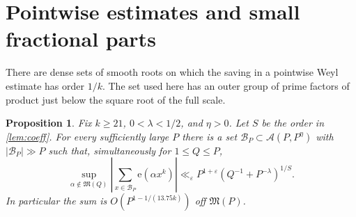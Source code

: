 \documentclass[11pt,letterpaper]{article}
\newtheorem{proposition}[proposition]{Proposition}
\theoremstyle{definition}
\newcommand{\A}{\mathcal A}
\newcommand{\M}{\mathfrak M}
\newcommand{\e}{\mathrm e}
\newcommand{\eps}{\varepsilon}
\begin{document}
\section{Pointwise estimates and small fractional parts}\label{sec:fractional}
There are dense sets of smooth roots on which the saving in a pointwise
Weyl estimate has order $1/k$. The set used here has an outer group of
prime factors of product just below the square root of the full scale.
\begin{proposition}\label{prop:sampledweyl}
Fix $k\ge21$, $0<\lambda<1/2$, and $\eta>0$. Let $S$ be the order
in \cref{lem:coeff}. For every sufficiently large $P$ there is a set
$\mathcal B_P\subset\A(P,P^\eta)$ with $|\mathcal B_P|\gg P$ such
that, simultaneously for $1\le Q\le P$,
\[
 \sup_{\alpha\notin\M(Q)}
 \left|\sum_{x\in\mathcal B_P}\e(\alpha x^k)\right|
 \ll_\eps P^{1+\eps}(Q^{-1}+P^{-\lambda})^{1/S}.
\]
In particular the sum is $O(P^{1-1/(13.75k)})$ off $\M(P)$.
\end{proposition}
\end{document}
